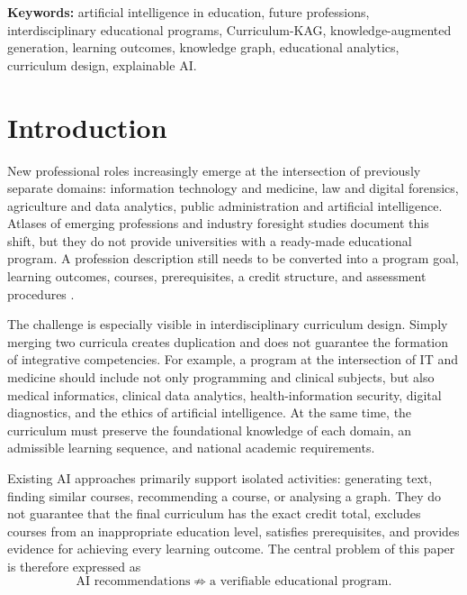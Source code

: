 \documentclass[twoside,11pt]{article}
\begin{document}
\medskip
\noindent\textbf{Keywords:}
artificial intelligence in education, future professions, interdisciplinary educational programs, Curriculum-KAG, knowledge-augmented generation, learning outcomes, knowledge graph, educational analytics, curriculum design, explainable AI.

\section{Introduction}

New professional roles increasingly emerge at the intersection of previously separate domains: information technology and medicine, law and digital forensics, agriculture and data analytics, public administration and artificial intelligence. Atlases of emerging professions and industry foresight studies document this shift, but they do not provide universities with a ready-made educational program. A profession description still needs to be converted into a program goal, learning outcomes, courses, prerequisites, a credit structure, and assessment procedures \cite{Atlas2026}.

The challenge is especially visible in interdisciplinary curriculum design. Simply merging two curricula creates duplication and does not guarantee the formation of integrative competencies. For example, a program at the intersection of IT and medicine should include not only programming and clinical subjects, but also medical informatics, clinical data analytics, health-information security, digital diagnostics, and the ethics of artificial intelligence. At the same time, the curriculum must preserve the foundational knowledge of each domain, an admissible learning sequence, and national academic requirements.

Existing AI approaches primarily support isolated activities: generating text, finding similar courses, recommending a course, or analysing a graph. They do not guarantee that the final curriculum has the exact credit total, excludes courses from an inappropriate education level, satisfies prerequisites, and provides evidence for achieving every learning outcome. The central problem of this paper is therefore expressed as
\begin{equation}
  \text{AI recommendations}\not\Rightarrow\text{a verifiable educational program}.
  \label{eq:gap-main}
\end{equation}
\end{document}
